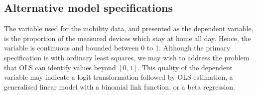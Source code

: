 \documentclass{article}
\begin{document}
\begin{singlespace}
\end{singlespace}


\subsection{Alternative model specifications}\label{alt-specs}
The variable used for the mobility data, and presented as the dependent variable, is the proportion of the measured devices which stay at home all day. Hence, the variable is continuous and bounded between 0 to 1. Although the primary specification is with ordinary least squares, we may wish to address the problem that OLS can identify values beyond \([0,1]\). This quality of the dependent variable may indicate a logit transformation followed by OLS estimation, a generalised linear model with a binomial link function, or a beta regression. 
\end{document}
